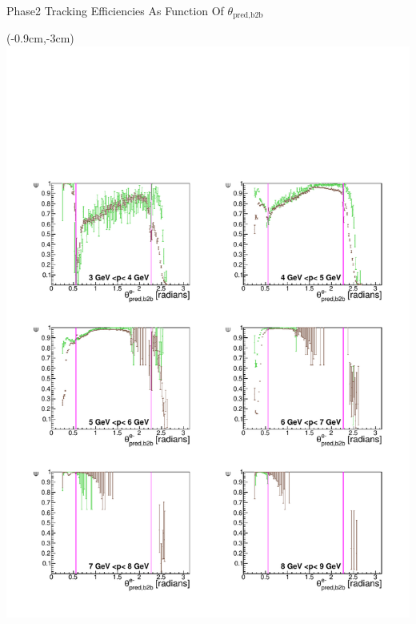 \documentclass[8pt]{beamer}
\begin{document}
\begin{frame}{Phase2 Tracking Efficiencies As Function Of $\theta_{\textrm{pred,b2b}}$}
	
	
	\begin{textblock*}{6.5cm}(-0.9cm,-3cm)
		\includegraphics[width=\textwidth]{VPlots/P2/xPMThetaem}
	\end{textblock*}
	

\end{frame}
\end{document}
